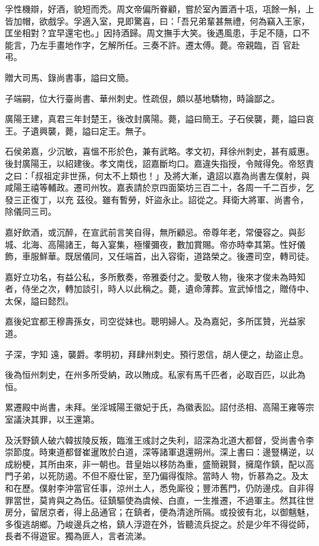 \begin{pinyinscope}
 孚性機辯，好酒，貌短而禿。周文帝偏所眷顧，嘗於室內置酒十瓨，瓨餘一斛，上皆加帽，欲戲孚。孚適入室，見即驚喜，曰：「吾兄弟輩甚無禮，何為竊入王家，匡坐相對？宜早還宅也。」因持酒歸。周文撫手大笑。後遇風患，手足不隨，口不能言，乃左手畫地作字，乞解所任。三奏不許。遷太傅。薨。帝親臨，百
 官赴弔。



 贈大司馬、錄尚書事，謚曰文簡。



 子端嗣，位大行臺尚書、華州刺史。性疏佷，頗以基地驕物，時論鄙之。



 廣陽王建，真君三年封楚王，後改封廣陽。薨，謚曰簡王。子石侯襲，薨，謚曰哀王。子遺興襲，薨，謚曰定王。無子。



 石侯弟嘉，少沉敏，喜慍不形於色，兼有武略。孝文初，拜徐州刺史，甚有威惠。後封廣陽王，以紹建後。孝文南伐，詔嘉斷均口。嘉違失指授，令賊得免。帝怒責之曰：「叔祖定非世孫，何太不上類也！」及將大漸，遺詔以嘉為尚書左僕射，與咸陽王禧等輔政。遷司州牧。嘉表請於京四面築坊三百二十，各周一千二百步，乞發三正復丁，以充
 茲役。雖有暫勞，奸盜永止。詔從之。拜衛大將軍、尚書令，除儀同三司。



 嘉好飲酒，或沉醉，在宣武前言笑自得，無所顧忌。帝尊年老，常優容之。與彭城、北海、高陽諸王，每入宴集，極懽彌夜，數加賞賜。帝亦時幸其第。性好儀飾，車服鮮華。既居儀同，又任端首，出入容衛，道路榮之。後遷司空，轉司徒。



 嘉好立功名，有益公私，多所敷奏，帝雅委付之。愛敬人物，後來才俊未為時知者，侍坐之次，轉加談引，時人以此稱之。薨，遺命薄葬。宣武悼惜之，贈侍中、太保，謚曰懿烈。



 嘉後妃宜都王穆壽孫女，司空從妹也。聰明婦人。及為嘉妃，多所匡贊，光益家道。



 子深，字知
 遠，襲爵。孝明初，拜肆州刺史。預行恩信，胡人便之，劫盜止息。



 後為恒州刺史，在州多所受納，政以賄成。私家有馬千匹者，必取百匹，以此為恒。



 累遷殿中尚書，未拜。坐淫城陽王徽妃于氏，為徽表訟。詔付丞相、高陽王雍等宗室議決其罪，以王還第。



 及沃野鎮人破六韓拔陵反叛，臨淮王彧討之失利，詔深為北道大都督，受尚書令李崇節度。時東道都督崔暹敗於白道，深等諸軍退還朔州。深上書曰：邊豎構逆，以成紛梗，其所由來，非一朝也。昔皇始以移防為重，盛簡親賢，擁麾作鎮，配以高門子弟，以死防遏。不但不廢仕宦，至乃偏得復除。當時人
 物，忻慕為之。及太和在歷。僕射李沖當官任事，涼州土人，悉免廝役；豐沛舊門，仍防邊戍。自非得罪當世，莫肯與之為伍。征鎮驅使為虞候、白直，一生推遷，不過軍主。然其往世房分，留居京者，得上品通官；在鎮者，便為清途所隔。或投彼有北，以御魑魅，多復逃胡鄉。乃峻邊兵之格，鎮人浮遊在外，皆聽流兵捉之。於是少年不得從師，長者不得遊宦。獨為匪人，言者流涕。




\end{pinyinscope}
